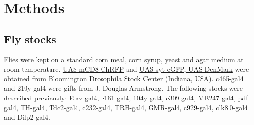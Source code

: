 \section*{Methods}

\subsection*{Fly stocks}

Flies were kept on a standard corn meal, corn syrup, yeast and agar medium at room temperature.
\href{http://flystocks.bio.indiana.edu/Reports/27392.html}{UAS-mCD8-ChRFP} and \href{http://flystocks.bio.indiana.edu/Reports/33065.html}{UAS-syt-eGFP, UAS-DenMark} were obtained from \href{http://flystocks.bio.indiana.edu}{Bloomington Drosophila Stock Center} (Indiana, USA).
c465-gal4 and 210y-gal4 were gifts from J. Douglas Armstrong.
The following stocks were described previously: Elav-gal4\cite{Lin:1994vn}, c161-gal4\cite{renn:1999aa}, 104y-gal4\cite{sakai:2006aa}, c309-gal4\cite{connolly:1996aa}, MB247-gal4\cite{zars:2000aa}, pdf-gal4\cite{renn:1999ab}, TH-gal4\cite{friggi-grelin:2003aa}, Tdc2-gal4\cite{alekseyenko:2010aa}, c232-gal4\cite{renn:1999aa}, TRH-gal4\cite{alekseyenko:2010aa}, GMR-gal4\cite{freeman:1996aa}, c929-gal4\cite{taghert:2001aa}, clk8.0-gal4\cite{glossop:2003aa} and Dilp2-gal4\cite{Rulifson:2002cg}.
  